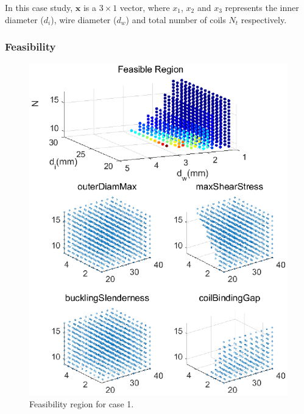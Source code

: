 \documentclass[10pt]{article}
\begin{document}
\begin{flushleft}
In this case study, $\textbf{x}$ is a $3 \times 1$ vector, where $x_{1}$, $x_{2}$ and $x_{3}$ represents the inner diameter ($d_{i}$), wire diameter ($d_{w}$) and total number of coils $N_{t}$ respectively.

\end{flushleft}
    
\newpage
	
	\subsubsection{Feasibility}
	
			\begin{figure}[H]
		 \begin{center}\includegraphics[scale=.5]{Case_56_38910new.eps}\end{center}
		 \caption{Feasibility region for case 1.}
		 \label{Feasibility region for case 1.}
		 \end{figure}
\end{document}
